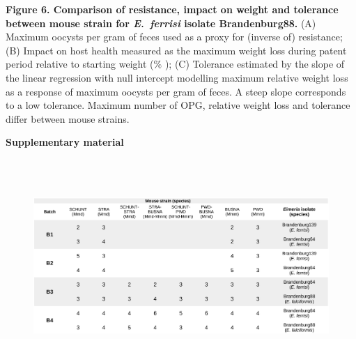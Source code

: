 \documentclass[12pt]{article}
\renewcommand{\_}{\kern-1.5pt\textunderscore\kern-1.5pt}
\begin{document}

\par

{\fontsize{10pt}{12.0pt}\selectfont \textbf{Figure 6. Comparison of resistance, impact on weight and tolerance between mouse strain for \textit{E. ferrisi }isolate Brandenburg88. }(A) Maximum oocysts per gram of feces used as a proxy for (inverse of) resistance; (B) Impact on host health measured as the maximum weight loss during patent period relative to starting weight ($\%$ ); (C) Tolerance estimated by the slope of the linear regression with null intercept modelling maximum relative weight loss as a response of maximum oocysts per gram of feces. A steep slope corresponds to a low tolerance. \textcolor[HTML]{FF0000}{Maximum number of OPG, relative weight loss and tolerance differ between mouse strains.}\par}


\newpage
\par

\begin{FlushLeft}
{\fontsize{14pt}{16.8pt}\selectfont \textbf{Supplementary material}\par}
\end{FlushLeft}\par




\begin{figure}[H]
	\begin{Center}
		\includegraphics[width=6.92in,height=3.18in]{./media/image9.png}
	\end{Center}
\end{figure}
\end{document}
